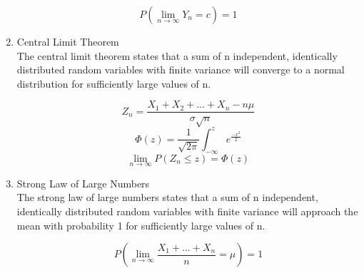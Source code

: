 \documentclass{article}
\begin{document}
\begin{enumerate}
    $$P(\lim_{n\to\infty}Y_n = c) = 1$$
    
    \item Central Limit Theorem \\
    The central limit theorem states that a sum of n independent, identically distributed random variables with finite variance will converge to a normal distribution for sufficiently large values of n. 
    
    $$Z_n = \frac{X_1 + X_2 + ... + X_n - n\mu}{\sigma\sqrt{n}}$$
    $$\Phi(z) = \frac{1}{\sqrt{2\pi}}\int_{-\infty}^{z}e^{\frac{-x^2}{2}}$$
    $$\lim_{n \to \infty} P(Z_n \leq z) = \Phi(z)$$
    
    \item Strong Law of Large Numbers \\ 
    The strong law of large numbers states that a sum of n independent, identically distributed random variables with finite variance will approach the mean with probability 1 for sufficiently large values of n.
    
    $$P(\lim_{n \to \infty} \frac{X_1 + ... + X_n}{n} = \mu) = 1$$
    
\end{enumerate}
\end{document}
